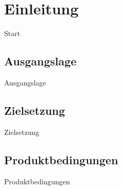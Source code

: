 \section{Einleitung}
Start

\subsection{Ausgangslage}

Ausgangslage

\subsection{Zielsetzung}

Zielsetzung

\subsection{Produktbedingungen}

Produktbedingungen


